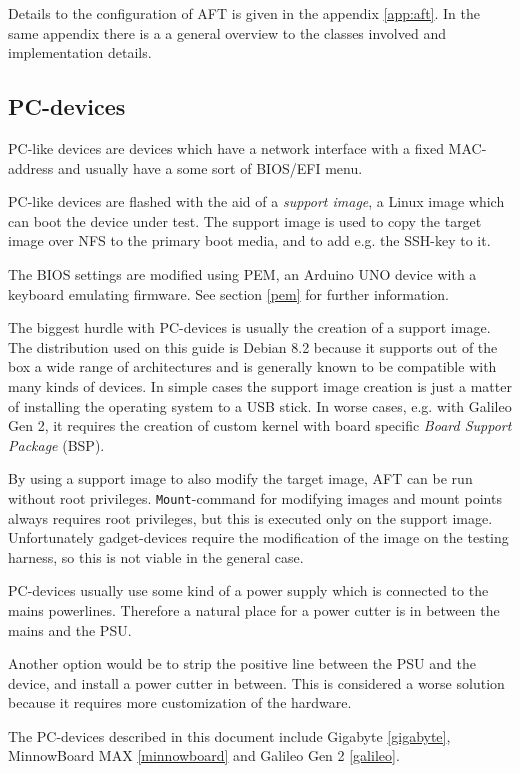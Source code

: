 \documentclass[a4paper,11pt]{article}
\newcommand{\cmd}[1]{\texttt{#1}}
\begin{document}
Details to the configuration of AFT is given in the appendix \ref{app:aft}. In the same appendix there is a a general overview to the classes involved and implementation details.

\subsection{PC-devices}
\label{pc}
PC-like devices are devices which have a network interface with a fixed MAC-address and usually have a some sort of BIOS/EFI menu.

PC-like devices are flashed with the aid of a \textit{support image}, a Linux image which can boot the device under test. The support image is used to copy the target image over NFS to the primary boot media, and to add e.g. the SSH-key to it.

The BIOS settings are modified using PEM, an Arduino UNO device with a keyboard emulating firmware. See section \ref{pem} for further information.

The biggest hurdle with PC-devices is usually the creation of a support image. The distribution used on this guide is Debian 8.2 because it supports out of the box a wide range of architectures and is generally known to be compatible with many kinds of devices. In simple cases the support image creation is just a matter of installing the operating system to a USB stick. In worse cases, e.g. with Galileo Gen 2, it requires the creation of custom kernel with board specific \textit{Board Support Package} (BSP).

By using a support image to also modify the target image, AFT can be run without root privileges. \cmd{Mount}-command for modifying images and mount points always requires root privileges, but this is executed only on the support image. Unfortunately gadget-devices require the modification of the image on the testing harness, so this is not viable in the general case.

PC-devices usually use some kind of a power supply which is connected to the mains powerlines. Therefore a natural place for a power cutter is in between the mains and the PSU.

Another option would be to strip the positive line between the PSU and the device, and install a power cutter in between. This is considered a worse solution because it requires more customization of the hardware.

The PC-devices described in this document include Gigabyte \ref{gigabyte}, MinnowBoard MAX \ref{minnowboard} and Galileo Gen 2 \ref{galileo}.
\end{document}

